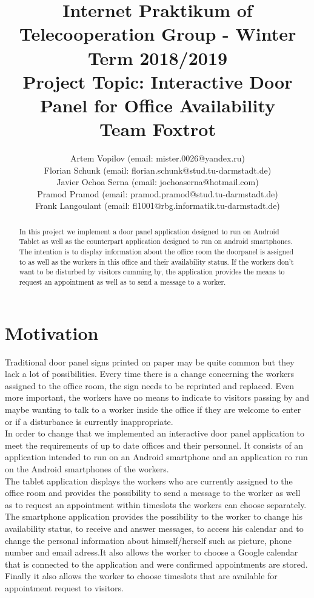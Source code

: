 \documentclass[article,colorback,accentcolor=tud4c, 11pt]{tudreport}
\title{Internet Praktikum of Telecooperation Group - Winter Term 2018/2019\\
	Project Topic: Interactive Door Panel for Office Availability\\ Team Foxtrot}
\subtitle{Artem Vopilov (email: mister.0026@yandex.ru)\\Florian Schunk (email: florian.schunk@stud.tu-darmstadt.de)\\ Javier Ochoa Serna (email: jochoaserna@hotmail.com)\\
	Pramod Pramod (email: pramod.pramod@stud.tu-darmstadt.de) \\ Frank Langoulant (email: fl1001@rbg.informatik.tu-darmstadt.de)}
\begin{document}
	\maketitle
	\begin{abstract}
		In this project we implement a door panel application designed to run on  Android Tablet as well as the counterpart application designed to run on android smartphones. The intention is to display information about the office room the doorpanel is assigned to as well as the workers in this office and their availability status. If the workers don't want to be disturbed by visitors cumming by, the application provides the means to request an appointment as well as to send a message to a worker.
	\end{abstract}  
	
	\tableofcontents
	\newpage
	
	\section{Motivation}
	
Traditional door panel signs printed on paper may be quite common but they lack a lot of possibilities. Every time there is a change concerning the workers assigned to the office room, the sign needs to be reprinted and replaced. Even more important, the workers have no means to indicate to visitors passing by and maybe wanting to talk to a worker inside the office if they are welcome to enter or if a disturbance is currently inappropriate. \\

In order to change that we implemented an interactive door panel application to meet the requirements of up to date offices and their personnel. It consists of an application intended to run on an Android smartphone and an application ro run on the Android smartphones of the workers. \\

The tablet application displays the workers who are currently assigned to the office room and provides the possibility to send a message to the worker as well as to request an appointment within timeslots the workers can choose separately. \\

The smartphone application provides the possibility to the worker to change his availability status, to receive and answer messages, to access his calendar and to change the personal information about himself/herself such as picture, phone number and email adress.It also allows the worker to choose a Google calendar that is connected to the application and were confirmed appointments are stored. Finally it also allows the worker to choose timeslots that are available for appointment request to visitors.\\
\end{document}
